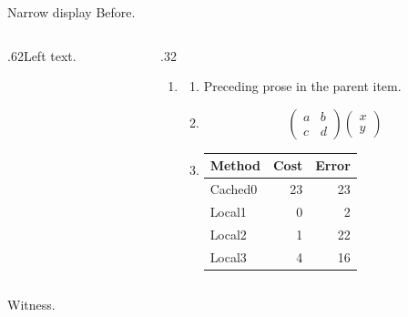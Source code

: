 \documentclass[12pt,aspectratio=169]{beamer}
\begin{document}
\begin{frame}[t,shrink=5]{Narrow display}
Before.\par
\begin{columns}[onlytextwidth,T]
\begin{column}{.62\textwidth}Left text.\end{column}
\begin{column}{.32\textwidth}
\begin{enumerate}\item \begin{enumerate}
\item Preceding prose in the parent item.
\item \[\begin{pmatrix}a&b\\c&d\end{pmatrix}\begin{pmatrix}x\\y\end{pmatrix}\]
\item \begin{tabular}{lrr}Method&Cost&Error\\\hline Cached0&23&23\\Local1&0&2\\Local2&1&22\\Local3&4&16\\\end{tabular}
\end{enumerate}\end{enumerate}
\end{column}\end{columns}
Witness.\par
\end{frame}
\end{document}
